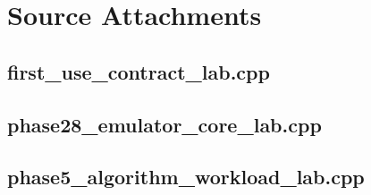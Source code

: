 \documentclass[11pt,twoside,openany]{book}
\begin{document}
\chapter{Source Attachments}
\hypertarget{source-file-a41016f2e326b40cdff18ff4}{}
\label{attachmentstart:source-file-a41016f2e326b40cdff18ff4}
\section*{first\_use\_contract\_lab.cpp}
\hypertarget{source-file-552a9e2296dc984412c8f06d}{}
\label{attachmentstart:source-file-552a9e2296dc984412c8f06d}
\section*{phase28\_emulator\_core\_lab.cpp}
\hypertarget{source-file-0ec69e1a1a11439bca29faa5}{}
\label{attachmentstart:source-file-0ec69e1a1a11439bca29faa5}
\section*{phase5\_algorithm\_workload\_lab.cpp}
\end{document}
